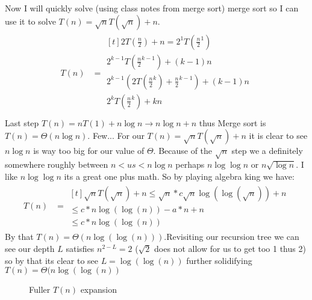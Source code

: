 \documentclass{article}
\begin{document}
Now I will quickly solve (using class notes from merge sort) merge sort so I can use it to solve $ T(n)=\sqrt{n}T(\sqrt{n})+n$.
\begin{align}
   T(n)&= \begin{aligned}[t]
     2T(\frac{n}{2})+n = 2^1T(\frac{n}{2}^{\!1})\\ 
      2^{k-1}T(\frac{n}{2}^{\!k-1})+(k-1)n\\
       2^{k-1} \left( 2T(\frac{n}{2}^{\!k})+\frac{n}{2}^{\!k-1}\right)+(k-1)n \\
       2^kT(\frac{n}{2}^{\!k})+kn \\
       \end{aligned}
\end{align}
Last step $T(n)=nT(1)+n \log n \to n \log n +n$ thus Merge sort is $T(n)=\Theta(n \log n)$. Few...\newline
For  our $ T(n)=\sqrt{n}T(\sqrt{n})+n$ it is clear to see $n \log n$ is way too big for our value of $\Theta$.
Because of the $\sqrt{n}$ step we a definitely somewhere roughly between $n < us < n \log n$ perhaps  $n \log \log n$ or $n \sqrt{\log n}$. I like $n \log \log n$ its a great one plus math.
So by playing algebra king we have:
\begin{align}
   T(n)&=
   \begin{aligned}[t]
   \sqrt{n}T(\sqrt{n})+n \leq \sqrt{n}*c\sqrt{n}\log(\log( \sqrt{n})) + n \\
   \leq c*n\log(\log(n)) - a*n +n \\
   \leq c*n\log(\log(n))
       \end{aligned}
\end{align}
By that $T(n)=\Theta(n\log(\log(n)))$.\newline Revisiting our recursion tree we can see our depth $L$ satisfies $n^{2-L}=2$ \newline ($\sqrt{2}$ does not allow for us to get too 1 thus 2) so by that its clear to see $L=\log(\log( n))$ further solidifying $T(n)=\Theta(n\log(\log(n))$
\begin{figure}[h!]
\centering
		\caption{Fuller $T(n)$ expansion}
\end{figure}
\end{document}
